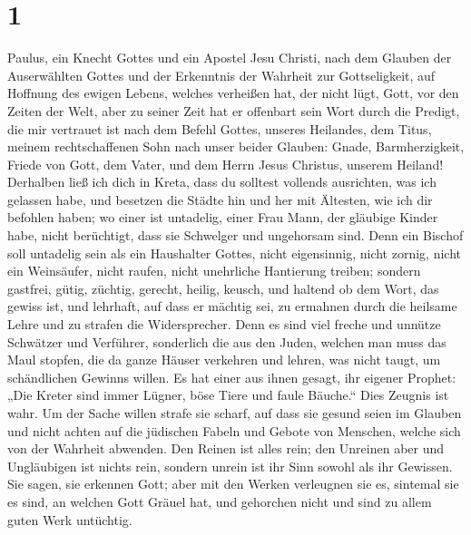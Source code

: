 \hypertarget{section}{%
\section{1}\label{section}}

 Paulus, ein Knecht Gottes und ein Apostel Jesu Christi,
nach dem Glauben der Auserwählten Gottes und der Erkenntnis der Wahrheit
zur Gottseligkeit,  auf Hoffnung des ewigen Lebens,
welches verheißen hat, der nicht lügt, Gott, vor den Zeiten der Welt,
 aber zu seiner Zeit hat er offenbart sein Wort durch die
Predigt, die mir vertrauet ist nach dem Befehl Gottes, unseres
Heilandes,  dem Titus, meinem rechtschaffenen Sohn nach
unser beider Glauben: Gnade, Barmherzigkeit, Friede von Gott, dem Vater,
und dem Herrn Jesus Christus, unserem Heiland!  Derhalben
ließ ich dich in Kreta, dass du solltest vollends ausrichten, was ich
gelassen habe, und besetzen die Städte hin und her mit Ältesten, wie ich
dir befohlen haben;  wo einer ist untadelig, einer Frau
Mann, der gläubige Kinder habe, nicht berüchtigt, dass sie Schwelger und
ungehorsam sind.  Denn ein Bischof soll untadelig sein als
ein Haushalter Gottes, nicht eigensinnig, nicht zornig, nicht ein
Weinsäufer, nicht raufen, nicht unehrliche Hantierung treiben;
 sondern gastfrei, gütig, züchtig, gerecht, heilig,
keusch,  und haltend ob dem Wort, das gewiss ist, und
lehrhaft, auf dass er mächtig sei, zu ermahnen durch die heilsame Lehre
und zu strafen die Widersprecher.  Denn es sind viel
freche und unnütze Schwätzer und Verführer, sonderlich die aus den
Juden,  welchen man muss das Maul stopfen, die da ganze
Häuser verkehren und lehren, was nicht taugt, um schändlichen Gewinns
willen.  Es hat einer aus ihnen gesagt, ihr eigener
Prophet: „Die Kreter sind immer Lügner, böse Tiere und faule Bäuche.``
 Dies Zeugnis ist wahr. Um der Sache willen strafe sie
scharf, auf dass sie gesund seien im Glauben  und nicht
achten auf die jüdischen Fabeln und Gebote von Menschen, welche sich von
der Wahrheit abwenden.  Den Reinen ist alles rein; den
Unreinen aber und Ungläubigen ist nichts rein, sondern unrein ist ihr
Sinn sowohl als ihr Gewissen.  Sie sagen, sie erkennen
Gott; aber mit den Werken verleugnen sie es, sintemal sie es sind, an
welchen Gott Gräuel hat, und gehorchen nicht und sind zu allem guten
Werk untüchtig.

